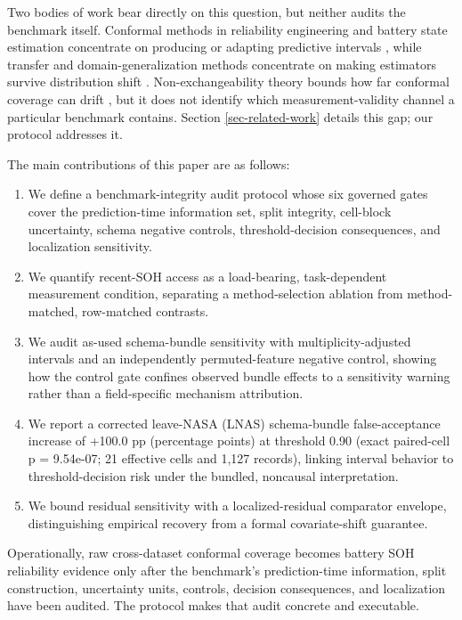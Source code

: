 \documentclass[
  number,
  preprint]{elsarticle}
\providecommand{\tightlist}{%
  \setlength{\itemsep}{0pt}\setlength{\parskip}{0pt}}
\begin{document}
Two bodies of work bear directly on this question, but neither audits
the benchmark itself. Conformal methods in reliability engineering and
battery state estimation concentrate on producing or adapting predictive
intervals
\citep{xu2026uncertaintyaware, wang2025robust, javanmardi2023conformal, piao2025crulp, soon2026enhancing},
while transfer and domain-generalization methods concentrate on making
estimators survive distribution shift
\citep{nejjar2024domain, nejjar2026uncertaintyguided, fei2026decoupled}.
Non-exchangeability theory bounds how far conformal coverage can drift
\citep{barber2023beyond, oliveira2024split}, but it does not identify
which measurement-validity channel a particular benchmark contains.
Section \ref{sec-related-work} details this gap; our protocol addresses
it.

The main contributions of this paper are as follows:

\begin{enumerate}
\def\labelenumi{\arabic{enumi}.}
\tightlist
\item
  We define a benchmark-integrity audit protocol whose six governed
  gates cover the prediction-time information set, split integrity,
  cell-block uncertainty, schema negative controls, threshold-decision
  consequences, and localization sensitivity.
\item
  We quantify recent-SOH access as a load-bearing, task-dependent
  measurement condition, separating a method-selection ablation from
  method-matched, row-matched contrasts.
\item
  We audit as-used schema-bundle sensitivity with multiplicity-adjusted
  intervals and an independently permuted-feature negative control,
  showing how the control gate confines observed bundle effects to a
  sensitivity warning rather than a field-specific mechanism
  attribution.
\item
  We report a corrected leave-NASA (LNAS) schema-bundle false-acceptance
  increase of +100.0 pp (percentage points) at threshold 0.90 (exact
  paired-cell p = 9.54e-07; 21 effective cells and 1,127 records),
  linking interval behavior to threshold-decision risk under the
  bundled, noncausal interpretation.
\item
  We bound residual sensitivity with a localized-residual comparator
  envelope, distinguishing empirical recovery from a formal
  covariate-shift guarantee.
\end{enumerate}

Operationally, raw cross-dataset conformal coverage becomes battery SOH
reliability evidence only after the benchmark's prediction-time
information, split construction, uncertainty units, controls, decision
consequences, and localization have been audited. The protocol makes
that audit concrete and executable.
\end{document}
